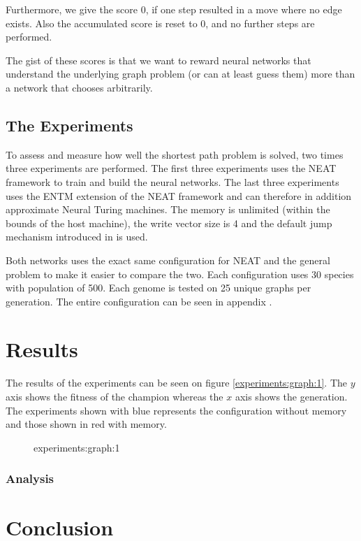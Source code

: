 \documentclass{article}
\begin{document}
Furthermore, we give the score 0, if one step resulted in a move where no edge exists. Also the accumulated score is reset to 0, and no further steps are performed.

The gist of these scores is that we want to reward neural networks that understand the underlying graph problem (or can at least guess them) more than a network that chooses arbitrarily.

\subsection{The Experiments}
To assess and measure how well the shortest path problem is solved, two times three experiments are performed. The first three experiments uses the NEAT framework to train and build the neural networks. The last three experiments uses the ENTM extension of the NEAT framework and can therefore in addition approximate Neural Turing machines. The memory is unlimited (within the bounds of the host machine), the write vector size is 4 and the default jump mechanism introduced in  is used. 

Both networks uses the exact same configuration for NEAT and the general problem to make it easier to compare the two. Each configuration uses 30 species with population of 500. Each genome is tested on 25 unique graphs per generation. The entire configuration can be seen in appendix . 

\section{Results}
The results of the experiments can be seen on figure \ref{experiments:graph:1}. The $ y $ axis shows the fitness of the champion whereas the $ x $ axis shows the generation. The experiments shown with blue represents the configuration without memory and those shown in red with memory. 

\begin{figure}
	\caption{experiments:graph:1}
	\label{Graph of the results}
\end{figure}



\subsubsection{Analysis}



\section{Conclusion}
\end{document}
